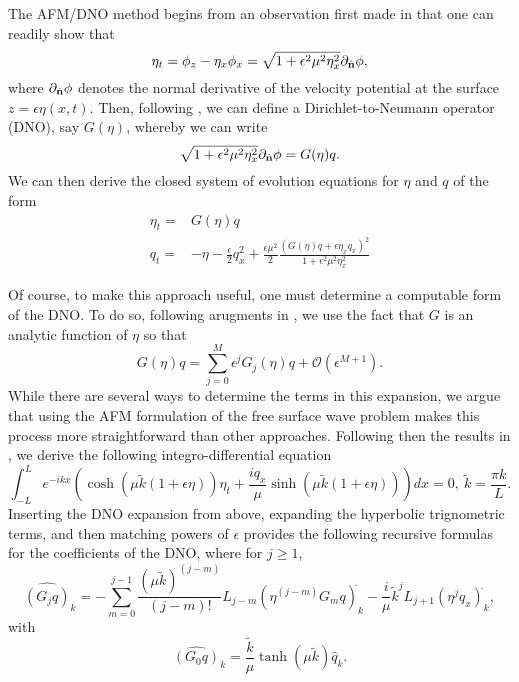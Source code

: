 The AFM/DNO method begins from an observation first made in \cite{zakharov} that one can readily show that 
\[
\eta_{t} = \phi_{z} - \eta_{x}\phi_{x} = \sqrt{1+\epsilon^{2}\mu^{2}\eta_{x}^{2}}\partial_{\hat{{\bf n}}} \phi,
\]
where $\partial_{\hat{{\bf n}}} \phi$ denotes the normal derivative of the velocity potential at the surface $z=\epsilon\eta(x,t)$.  Then, following \cite{zakharov}, we can define a Dirichlet-to-Neumann operator (DNO), say $G(\eta)$, whereby we can write 
\[
\sqrt{1+\epsilon^{2}\mu^{2}\eta_{x}^{2}}\partial_{\hat{{\bf n}}} \phi = G(\eta)q.
\]
We can then derive the closed system of evolution equations for $\eta$ and $q$ of the form 
\begin{align}
\eta_{t} = & G(\eta)q \\ 
q_{t} = & -\eta -\frac{\epsilon}{2}q_{x}^{2} + \frac{\epsilon\mu^{2}}{2}\frac{\left(G(\eta)q + \epsilon \eta_{x}q_{x}\right)^{2}}{1+\epsilon^{2}\mu^{2}\eta_{x}^{2}}
\end{align}

Of course, to make this approach useful, one must determine a computable form of the DNO.  To do so, following arugments in \cite{craig}, we use the fact that $G$ is an analytic function of $\eta$ so that 
\[
G(\eta)q = \sum_{j=0}^{M} \epsilon^{j}G_{j}(\eta)q + \mathcal{O}(\epsilon^{M+1}).
\]
While there are several ways to determine the terms in this expansion, we argue that using the AFM formulation of the free surface wave problem makes this process more straightforward than other approaches.  Following then the results in \cite{afm}, we derive the following integro-differential equation 
\[
\int_{-L}^{L}e^{-ikx}\left(\cosh(\mu \tilde{k} (1 + \epsilon\eta))\eta_{t} + \frac{iq_{x}}{\mu}\sinh(\mu \tilde{k} (1 + \epsilon\eta)) \right) dx = 0, ~ \tilde{k} = \frac{\pi k}{L}.
\]
Inserting the DNO expansion from above, expanding the hyperbolic trignometric terms, and then matching powers of $\epsilon$ provides the following recursive formulas for the coefficients of the DNO, where for $j\geq 1$,  
\begin{equation}
\widehat{\left(G_{j}q \right)}_{k} = -\sum_{m=0}^{j-1} \frac{(\mu\tilde{k})^{(j-m)}}{(j-m)!}L_{j-m} \left(\eta^{(j-m)}G_{m}q\right)^{\widehat{}}_{k} - \frac{i}{\mu}\tilde{k}^{j}L_{j+1} \left(\eta^{j}q_{x}\right)^{\widehat{}}_{k}, 
\label{dnorecurs}
\end{equation}
with 
\[
\widehat{\left(G_{0}q \right)}_{k} = \frac{\tilde{k}}{\mu}\tanh(\mu\tilde{k})\hat{q}_{k}.
\]
